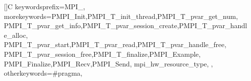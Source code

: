 \newcommand{\toolchangebeg}[1]{\cbstart{\color{green}#1}\xspace}
\newcommand{\toolchangeend}{\cbend}

\newcommand{\chgfeba}[1]{\toolchangebeg{#1}\toolchangeend}
\newcommand{\chgfebb}[1]{\toolchangebeg{#1}\toolchangeend}

\renewcommand{\textfraction}{0.07}
\renewcommand{\floatpagefraction}{0.9}
\setcounter{topnumber}{10}
\setcounter{bottomnumber}{10}
\setcounter{totalnumber}{20} 
   
\def\eg{e.g.}

\usepackage{listings}



[]{C}%
{%
        keywordsprefix={MPI_},%
        morekeywords={PMPI_Init,PMPI_T_init_thread,PMPI_T_pvar_get_num,%
PMPI_T_pvar_get_info,PMPI_T_pvar_session_create,PMPI_T_pvar_handle_alloc,%
PMPI_T_pvar_start,PMPI_T_pvar_read,PMPI_T_pvar_handle_free,%
PMPI_T_pvar_session_free,PMPI_T_finalize,PMPI_Example,%
PMPI_Finalize,PMPI_Recv,PMPI_Send,%
mpi_hw_resource_type,
},%
        otherkeywords={\#pragma},
}


\newcommand{\appref}[1]{Appendix~\ref{#1}}
\newcommand{\appsref}[2]{Appendices~\ref{#1} and~\ref{#2}}
\newcommand{\chapref}[1]{Chapter~\ref{#1}}
\newcommand{\secref}[1]{Section~\ref{#1}}
\newcommand{\secsref}[2]{Sections~\ref{#1} and~\ref{#2}}
\newcommand{\figref}[1]{Figure~\ref{#1}}
\newcommand{\figsref}[2]{Figures~\ref{#1} and~\ref{#2}}
\newcommand{\exref}[1]{Example~\ref{#1}}
\newcommand{\tabref}[1]{Table~\ref{#1}}

